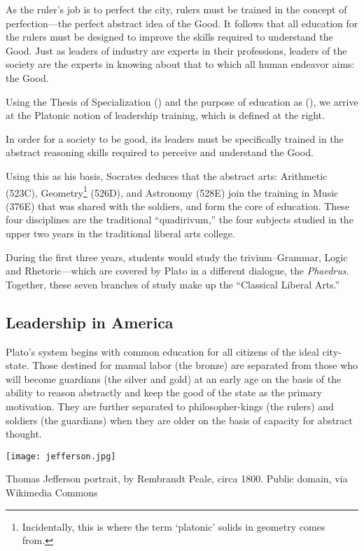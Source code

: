 As the ruler's job is to perfect the city, rulers must be trained in the concept of perfection---the perfect abstract idea of the Good. It follows that all education for the rulers must be designed to improve the skills required to understand the Good. Just as leaders of industry are experts in their professions, leaders of the society are the experts in knowing about that to which all human endeavor aims: the Good.

Using the Thesis of Specialization () and the purpose of education as (), we arrive at the Platonic notion of leadership training, which is defined at the right. 
\begin{purpose}\label{eq:platonicleadership}
In order for a society to be good, its leaders must be specifically trained in the abstract reasoning skills required to perceive and understand the Good.\end{purpose}

Using this as his basis, Socrates deduces that the abstract arts: Arithmetic (523C), Geometry\footnote{Incidentally, this is where the term `platonic' solids in geometry comes from.} (526D), and Astronomy (528E) join the training in Music (376E) that was shared with the soldiers, and form the core of education. These four disciplines are the traditional ``quadirivum,'' the four subjects studied in the upper two years in the traditional liberal arts college. 

During the first three years, students would study the trivium--Grammar, Logic and Rhetoric---which are covered by Plato in a different dialogue, the \emph{Phaedrus.} Together, these seven branches of study make up the ``Classical Liberal Arts.''

\subsection{Leadership in America}
\label{leadershipinamerica}

Plato's system begins with common education for all citizens of the ideal city-state. Those destined for manual labor (the bronze) are separated from those who will become guardians (the silver and gold) at an early age on the basis of the ability to reason abstractly and keep the good of the state as the primary motivation. They are further separated to philosopher-kings (the rulers) and soldiers (the guardians) when they are older on the basis of capacity for abstract thought.\begin{marginfigure}\texttt{[image: jefferson.jpg]}\caption{Thomas Jefferson portrait, by Rembrandt Peale, circa 1800. Public domain, via Wikimedia Commons}\label{fig:jefferson}\end{marginfigure}

